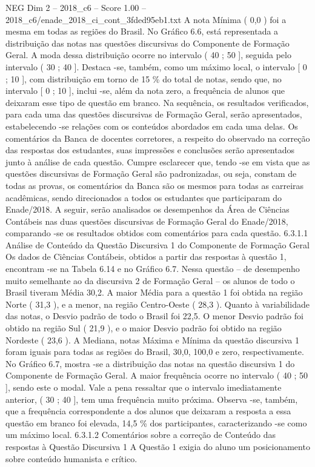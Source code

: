 \begin{textsample}{NEG Dim 2 – 2018\_c6 – Score 1.00 – 2018\_c6/enade\_2018\_ci\_cont\_3fded95eb1.txt}
A nota Mínima ( 0,0 ) foi a mesma em todas as regiões do Brasil.
No Gráfico 6.6, está representada a distribuição das notas nas questões discursivas do Componente de Formação Geral.
A moda dessa distribuição ocorre no intervalo ( 40 ; 50 ], seguida pelo intervalo ( 30 ; 40 ].
Destaca -se, também, como um máximo local, o intervalo [ 0 ; 10 ], com distribuição em torno de 15 \% do total de notas, sendo que, no intervalo [ 0 ; 10 ], inclui -se, além da nota zero, a frequência de alunos que deixaram esse tipo de questão em branco.
Na sequência, os resultados verificados, para cada uma das questões discursivas de Formação Geral, serão apresentados, estabelecendo -se relações com os conteúdos abordados em cada uma delas.
Os comentários da Banca de docentes corretores, a respeito do observado na correção das respostas dos estudantes, suas impressões e conclusões serão apresentados junto à análise de cada questão.
Cumpre esclarecer que, tendo -se em vista que as questões discursivas de Formação Geral são padronizadas, ou seja, constam de todas as provas, os comentários da Banca são os mesmos para todas as carreiras acadêmicas, sendo direcionados a todos os estudantes que participaram do Enade/2018.
A seguir, serão analisados os desempenhos da Área de Ciências Contábeis nas duas questões discursivas de Formação Geral do Enade/2018, comparando -se os resultados obtidos com comentários para cada questão. 6.3.1.1 Análise de Conteúdo da Questão Discursiva 1 do Componente de Formação Geral Os dados de Ciências Contábeis, obtidos a partir das respostas à questão 1, encontram -se na Tabela 6.14 e no Gráfico 6.7.
Nessa questão – de desempenho muito semelhante ao da discursiva 2 de Formação Geral – os alunos de todo o Brasil tiveram Média 30,2.
A maior Média para a questão 1 foi obtida na região Norte ( 31,3 ), e a menor, na região Centro-Oeste ( 28,3 ).
Quanto à variabilidade das notas, o Desvio padrão de todo o Brasil foi 22,5.
O menor Desvio padrão foi obtido na região Sul ( 21,9 ), e o maior Desvio padrão foi obtido na região Nordeste ( 23,6 ).
A Mediana, notas Máxima e Mínima da questão discursiva 1 foram iguais para todas as regiões do Brasil, 30,0, 100,0 e zero, respectivamente.
No Gráfico 6.7, mostra -se a distribuição das notas na questão discursiva 1 do Componente de Formação Geral.
A maior frequência ocorre no intervalo ( 40 ; 50 ], sendo este o modal.
Vale a pena ressaltar que o intervalo imediatamente anterior, ( 30 ; 40 ], tem uma frequência muito próxima.
Observa -se, também, que a frequência correspondente a dos alunos que deixaram a resposta a essa questão em branco foi elevada, 14,5 \% dos participantes, caracterizando -se como um máximo local. 6.3.1.2 Comentários sobre a correção de Conteúdo das respostas à Questão Discursiva 1 A Questão 1 exigia do aluno um posicionamento sobre conteúdo humanista e crítico.

\end{textsample}
